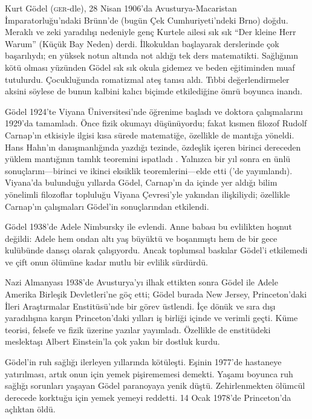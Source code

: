 \documentclass[../../../include/open-logic-section]{subfiles}
\begin{document}



Kurt G{\"o}del (\textsc{ger}-dle), 28 Nisan 1906'da Avusturya-Macaristan
İmparatorluğu'ndaki Br{\"u}nn'de (bugün Çek Cumhuriyeti'ndeki Brno) doğdu.
Meraklı ve zeki yaradılışı nedeniyle genç Kurtele ailesi sık sık ``Der
kleine Herr Warum'' (Küçük Bay Neden) derdi. İlkokuldan başlayarak derslerinde
çok başarılıydı; en yüksek notun altında not aldığı tek ders matematikti.
Sağlığının kötü olması yüzünden G{\"o}del sık sık okula gidemez ve beden
eğitiminden muaf tutulurdu. Çocukluğunda romatizmal ateş tanısı aldı. Tıbbi
değerlendirmeler aksini söylese de bunun kalbini kalıcı biçimde etkilediğine
ömrü boyunca inandı.

G{\"o}del 1924'te Viyana Üniversitesi'nde öğrenime başladı ve doktora
çalışmalarını 1929'da tamamladı. Önce fizik okumayı düşünüyordu; fakat kısmen
filozof Rudolf Carnap'ın etkisiyle ilgisi kısa sürede matematiğe, özellikle de
mantığa yöneldi. Hans Hahn'ın danışmanlığında yazdığı tezinde, özdeşlik içeren
birinci dereceden yüklem mantığının tamlık teoremini ispatladı
\citep{Godel1929}. Yalnızca bir yıl sonra en ünlü sonuçlarını---birinci ve
ikinci eksiklik teoremlerini---elde etti (\citealt{Godel1931}'de yayımlandı).
Viyana'da bulunduğu yıllarda G{\"o}del, Carnap'ın da içinde yer aldığı bilim
yönelimli filozoflar topluluğu Viyana Çevresi'yle yakından ilişkiliydi;
özellikle Carnap'ın çalışmaları G{\"o}del'in sonuçlarından etkilendi.

G\"odel 1938'de Adele Nimbursky ile evlendi. Anne babası bu evlilikten hoşnut
değildi: Adele hem ondan altı yaş büyüktü ve boşanmıştı hem de bir gece
kulübünde dansçı olarak çalışıyordu. Ancak toplumsal baskılar G{\"o}del'i
etkilemedi ve çift onun ölümüne kadar mutlu bir evlilik sürdürdü.

Nazi Almanyası 1938'de Avusturya'yı ilhak ettikten sonra G{\"o}del ile Adele
Amerika Birleşik Devletleri'ne göç etti; G{\"o}del burada New Jersey,
Princeton'daki İleri Araştırmalar Enstitüsü'nde bir görev üstlendi. İçe dönük
ve sıra dışı yaradılışına karşın Princeton'daki yılları iş birliği içinde ve
verimli geçti. Küme teorisi, felsefe ve fizik üzerine yazılar yayımladı.
Özellikle de enstitüdeki meslektaşı Albert Einstein'la çok yakın bir dostluk
kurdu.

G{\"o}del'in ruh sağlığı ilerleyen yıllarında kötüleşti. Eşinin 1977'de
hastaneye yatırılması, artık onun için yemek pişirememesi demekti. Yaşamı
boyunca ruh sağlığı sorunları yaşayan G{\"o}del paranoyaya yenik düştü.
Zehirlenmekten ölümcül derecede korktuğu için yemek yemeyi reddetti. 14 Ocak
1978'de Princeton'da açlıktan öldü.
\end{document}
